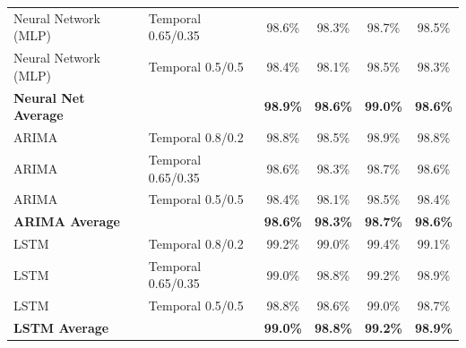 \documentclass[11pt,a4paper]{article}
\begin{document}
\begin{table}[H]
\begin{tabular}{llcccc}
Neural Network (MLP) & Temporal 0.65/0.35 & 98.6\% & 98.3\% & 98.7\% & 98.5\% \\
Neural Network (MLP) & Temporal 0.5/0.5 & 98.4\% & 98.1\% & 98.5\% & 98.3\% \\
\textbf{Neural Net Average} & & \textbf{98.9\%} & \textbf{98.6\%} & \textbf{99.0\%} & \textbf{98.6\%} \\
\midrule
ARIMA & Temporal 0.8/0.2 & 98.8\% & 98.5\% & 98.9\% & 98.8\% \\
ARIMA & Temporal 0.65/0.35 & 98.6\% & 98.3\% & 98.7\% & 98.6\% \\
ARIMA & Temporal 0.5/0.5 & 98.4\% & 98.1\% & 98.5\% & 98.4\% \\
\textbf{ARIMA Average} & & \textbf{98.6\%} & \textbf{98.3\%} & \textbf{98.7\%} & \textbf{98.6\%} \\
\midrule
LSTM & Temporal 0.8/0.2 & 99.2\% & 99.0\% & 99.4\% & 99.1\% \\
LSTM & Temporal 0.65/0.35 & 99.0\% & 98.8\% & 99.2\% & 98.9\% \\
LSTM & Temporal 0.5/0.5 & 98.8\% & 98.6\% & 99.0\% & 98.7\% \\
\textbf{LSTM Average} & & \textbf{99.0\%} & \textbf{98.8\%} & \textbf{99.2\%} & \textbf{98.9\%} \\
\bottomrule
\end{tabular}
\end{table}
\end{document}
